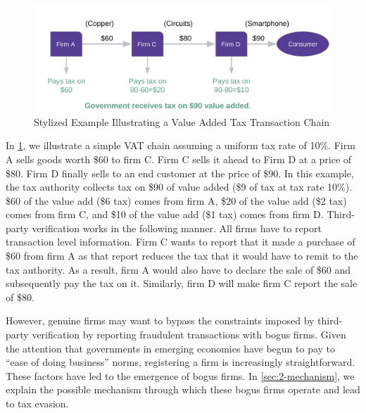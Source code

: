 \begin{figure}[t!]
  \includegraphics[width=1\textwidth]{graphs/VATExample.png}
  \caption{Stylized Example Illustrating a Value Added Tax Transaction Chain}
  \label{fig:bogus-mechanism}
\end{figure}

In \cref{fig:bogus-mechanism}, we illustrate a simple VAT chain assuming a uniform tax rate of 10\%. Firm A sells goods worth \$60 to firm C. Firm C sells it ahead to Firm D at a price of \$80. Firm D finally sells to an end customer at the price of \$90. In this example, the tax authority collects tax on \$90 of value added (\$9 of tax at tax rate 10\%). \$60 of the value add (\$6 tax) comes from firm A, \$20 of the value add (\$2 tax) comes from firm C, and \$10 of the value add (\$1 tax) comes from firm D. Third-party verification works in the following manner. All firms have to report transaction level information. Firm C wants to report that it made a purchase of \$60 from firm A as that report reduces the tax that it would have to remit to the tax authority. As a result, firm A would also have to declare the sale of \$60 and subsequently pay the tax on it. Similarly, firm D will make firm C report the sale of \$80.

However, genuine firms may want to bypass the constraints imposed by third-party verification by reporting fraudulent transactions with bogus firms. Given the attention that governments in emerging economies have begun to pay to ``ease of doing business'' norms, registering a firm is increasingly straightforward. These factors have led to the emergence of bogus firms. In \cref{sec:2-mechanism}, we explain the possible mechanism through which these bogus firms operate and lead to tax evasion.

